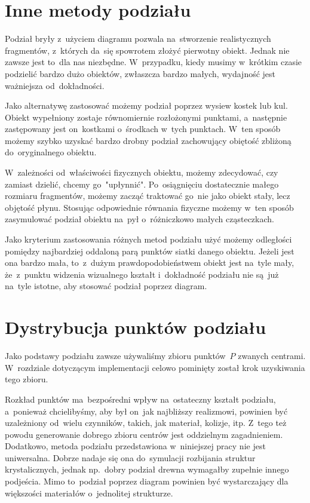 \documentclass[skorowidz,autorrok,backref,xodstep,oswiadczenie]{wmimgr}
\begin{document}
\section{Inne metody podziału}

Podział bryły z~użyciem diagramu pozwala na~stworzenie realistycznych fragmentów, z~których da~się spowrotem złożyć pierwotny obiekt. Jednak nie zawsze jest to~dla nas niezbędne. W~przypadku, kiedy musimy w~krótkim czasie podzielić bardzo dużo obiektów, zwłaszcza bardzo małych, wydajność jest ważniejsza od~dokładności.

Jako alternatywę zastosować możemy podział poprzez wysiew kostek lub kul. Obiekt wypełniony zostaje równomiernie rozłożonymi punktami, a~następnie zastępowany jest on~kostkami o~środkach w~tych punktach. W~ten sposób możemy szybko uzyskać bardzo drobny podział zachowujący obiętość zbliżoną do~oryginalnego obiektu.

W~zależności od~właściwości fizycznych obiektu, możemy zdecydować, czy zamiast dzielić, chcemy go~"upłynnić". Po~osiągnięciu dostatecznie małego rozmiaru fragmentów, możemy zacząć traktować go~nie jako obiekt stały, lecz objętość płynu. Stosując odpowiednie równania fizyczne możemy w~ten sposób zasymulować podział obiektu na~pył o~różniczkowo małych cząsteczkach.

Jako kryterium zastosowania różnych metod podziału użyć możemy odległości pomiędzy najbardziej oddaloną parą punktów siatki danego obiektu. Jeżeli jest ona bardzo mała, to~z~dużym prawdopodobieństwem obiekt jest na~tyle mały, że~z~punktu widzenia wizualnego kształt i~dokładność podziału nie są~już na~tyle istotne, aby stosować podział poprzez diagram.

\section{Dystrybucja punktów podziału}

Jako podstawy podziału zawsze używaliśmy zbioru punktów~$P$ zwanych centrami. W~rozdziale dotyczącym implementacji celowo pominięty został krok uzyskiwania tego zbioru.

Rozkład punktów ma~bezpośredni wpływ na~ostateczny kształt podziału, a~ponieważ chcielibyśmy, aby był on~jak najbliższy realizmowi, powinien być uzależniony od~wielu czynników, takich, jak materiał, kolizje, itp. Z~tego też powodu generowanie dobrego zbioru centrów jest oddzielnym zagadnieniem. Dodatkowo, metoda podziału przedstawiona w~niniejszej pracy nie jest uniwersalna. Dobrze nadaje się ona do~symulacji rozbijania struktur krystalicznych, jednak np.~dobry podział drewna wymagałby zupełnie innego podjeścia. Mimo to~podział poprzez diagram powinien być wystarczający dla większości materiałów o~jednolitej strukturze.
\end{document}
